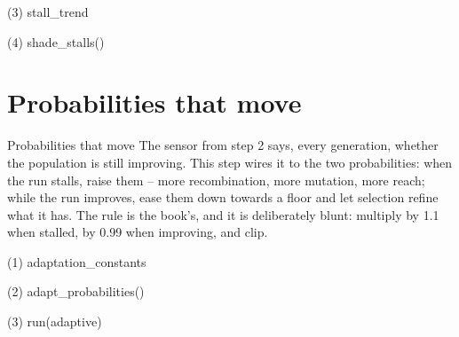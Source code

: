 \begin{frame}[fragile]{(3) stall\_trend}

\end{frame}

\begin{frame}[fragile]{(4) shade\_stalls()}

\end{frame}


\section{Probabilities that move}

\begin{frame}{Probabilities that move}
The sensor from step 2 says, every generation, whether the population is still
improving. This step wires it to the two probabilities: when the run stalls,
raise them -- more recombination, more mutation, more reach; while the run
improves, ease them down towards a floor and let selection refine what it has.
The rule is the book's, and it is deliberately blunt: multiply by 1.1 when
stalled, by 0.99 when improving, and clip.
\end{frame}

\begin{frame}[fragile]{(1) adaptation\_constants}

\end{frame}

\begin{frame}[fragile]{(2) adapt\_probabilities()}

\end{frame}

\begin{frame}[fragile]{(3) run(adaptive)}

\end{frame}

